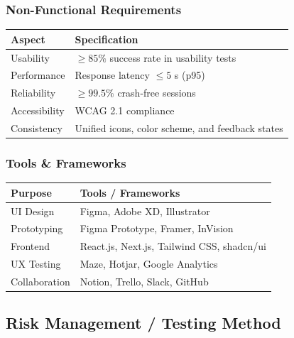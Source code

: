 \subsubsection{Non-Functional Requirements}
\renewcommand{\arraystretch}{1.12}
\begin{tabularx}{\textwidth}{|>{\raggedright\arraybackslash}p{2.9cm}|>{\raggedright\arraybackslash}X|}
\hline
	\textbf{Aspect} & \textbf{Specification} \\
\hline
Usability & $\ge 85\%$ success rate in usability tests \\
\hline
Performance & Response latency $\le 5$ s (p95) \\
\hline
Reliability & $\ge 99.5\%$ crash-free sessions \\
\hline
Accessibility & WCAG 2.1 compliance \\
\hline
Consistency & Unified icons, color scheme, and feedback states \\
\hline
\end{tabularx}

\subsubsection{Tools \& Frameworks}
\renewcommand{\arraystretch}{1.12}
\begin{tabularx}{\textwidth}{|>{\raggedright\arraybackslash}p{3.0cm}|>{\raggedright\arraybackslash}X|}
\hline
	\textbf{Purpose} & \textbf{Tools / Frameworks} \\
\hline
UI Design & Figma, Adobe XD, Illustrator \\
\hline
Prototyping & Figma Prototype, Framer, InVision \\
\hline
Frontend & React.js, Next.js, Tailwind CSS, shadcn/ui \\
\hline
UX Testing & Maze, Hotjar, Google Analytics \\
\hline
Collaboration & Notion, Trello, Slack, GitHub \\
\hline
\end{tabularx}

\subsection{Risk Management / Testing Method}

